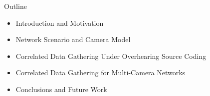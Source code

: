 \begin{frame}{Outline}
\begin{itemize}
\item Introduction and Motivation
\item Network Scenario and Camera Model
\item Correlated Data Gathering Under Overhearing Source Coding
\item Correlated Data Gathering for Multi-Camera Networks
\item Conclusions and Future Work
\end{itemize}
\end{frame}